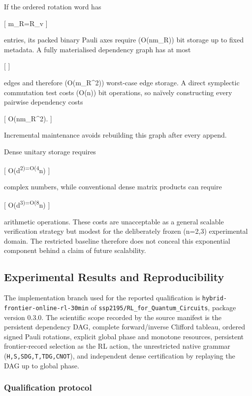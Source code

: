 \documentclass[
]{article}
\begin{document}
If the ordered rotation word has

{[} m\_R=\textbar{}\mathcal R\_v\textbar{} {]}

entries, its packed binary Pauli axes require (O(nm\_R)) bit storage up
to fixed metadata. A fully materialised dependency graph has at most

{[}  {]}

edges and therefore (O(m\_R\^{}2)) worst-case edge storage. A direct
symplectic commutation test costs (O(n)) bit operations, so naïvely
constructing every pairwise dependency costs

{[} O(nm\_R\^{}2).  {]}

Incremental maintenance avoids rebuilding this graph after every append.

Dense unitary storage requires

{[} O(d\textsuperscript{2)=O(4}n)  {]}

complex numbers, while conventional dense matrix products can require

{[} O(d\textsuperscript{3)=O(8}n)  {]}

arithmetic operations. These costs are unacceptable as a general
scalable verification strategy but modest for the deliberately frozen
(n=2,3) experimental domain. The restricted baseline therefore does not
conceal this exponential component behind a claim of future scalability.

\hypertarget{experimental-results-and-reproducibility}{%
\subsection{Experimental Results and
Reproducibility}\label{experimental-results-and-reproducibility}}

The implementation branch used for the reported qualification is
\texttt{hybrid-frontier-online-rl-30min} of
\texttt{ssp2195/RL\_for\_Quantum\_Circuits}, package version 0.3.0. The
scientific scope recorded by the source manifest is the persistent
dependency DAG, complete forward/inverse Clifford tableau, ordered
signed Pauli rotations, explicit global phase and monotone resources,
persistent frontier-record selection as the RL action, the unrestricted
native grammar (\texttt{H,S,SDG,T,TDG,CNOT}), and independent dense
certification by replaying the DAG up to global phase.

\hypertarget{qualification-protocol}{%
\subsubsection{Qualification protocol}\label{qualification-protocol}}
\end{document}
